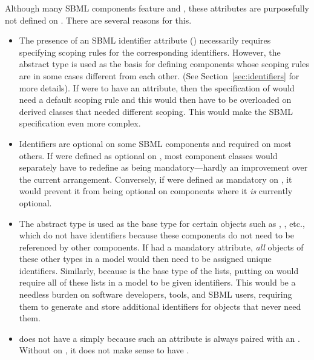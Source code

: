 Although many SBML components feature  and ,
these attributes are purposefully not defined on \SBase.  There
are several reasons for this.
\begin{itemize}
  
\item The presence of an SBML identifier attribute ()
  necessarily requires specifying scoping rules for the
  corresponding identifiers.  However, the \SBase abstract type is
  used as the basis for defining components whose scoping rules
  are in some cases different from each other.  (See
  Section~\ref{sec:identifiers} for more details).  If \SBase were
  to have an  attribute, then the specification of \SBase
  would need a default scoping rule and this would then have to be
  overloaded on derived classes that needed different scoping.
  This would make the SBML specification even more complex.
  
\item Identifiers are optional on some SBML components and required
  on most others.  If  were defined as optional on
  \SBase, most component classes would separately have to redefine
   as being mandatory---hardly an improvement over the
  current arrangement.  Conversely, if  were defined as
  mandatory on \SBase, it would prevent it from being optional on
  components where it \emph{is} currently optional.
  
\item The \SBase abstract type is used as the base type for
  certain objects such as \SBML, \AssignmentRule,
  etc., which do not have identifiers because these components do
  not need to be referenced by other components.  If \SBase had a
  mandatory  attribute, \emph{all} objects of
  these other types in a model would then need to be assigned
  unique identifiers.  Similarly, because \SBase is the
    base type of the  lists,
  putting  on \SBase would require all of these lists in
  a model to be given identifiers.  This would be a needless
  burden on software developers, tools, and SBML users, requiring
  them to generate and store additional identifiers for objects
  that never need them.
  
\item \SBase does not have a  simply because such an
  attribute is always paired with an .  Without
   on \SBase, it does not make sense to have
  .

\end{itemize}



